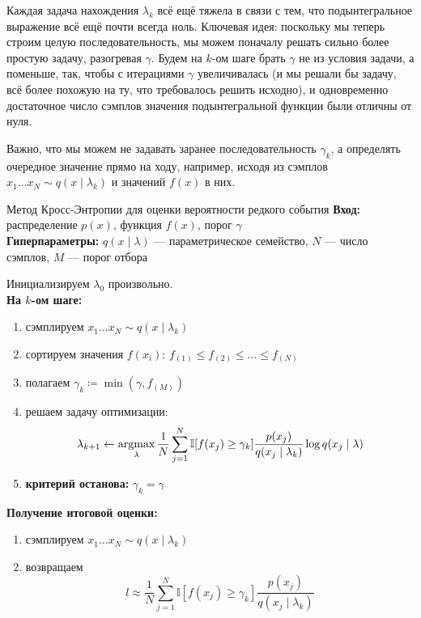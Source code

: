 Каждая задача нахождения $\lambda_k$ всё ещё тяжела в связи с тем, что подынтегральное выражение всё ещё почти всегда ноль. Ключевая идея: поскольку мы теперь строим целую последовательность, мы можем поначалу решать сильно более простую задачу, разогревая $\gamma$. Будем на $k$-ом шаге брать $\gamma$ не из условия задачи, а поменьше, так, чтобы с итерациями $\gamma$ увеличивалась (и мы решали бы задачу, всё более похожую на ту, что требовалось решить исходно), и одновременно достаточное число сэмплов значения подынтегральной функции были отличны от нуля.

Важно, что мы можем не задавать заранее последовательность $\gamma_k$, а определять очередное значение прямо на ходу, например, исходя из сэмплов $x_1 \dots x_N \sim q(x \mid \lambda_{k})$ и значений $f(x)$ в них.

\begin{algorithm}[label=alg:rareeventestimate]{Метод Кросс-Энтропии для оценки вероятности редкого события}
\textbf{Вход:} распределение $p(x)$, функция $f(x)$, порог $\gamma$ \\
\textbf{Гиперпараметры:} $q(x \mid \lambda)$ --- параметрическое семейство, $N$ --- число сэмплов, $M$ --- порог отбора

\vspace{0.3cm}
Инициализируем $\lambda_0$ произвольно. \\
\textbf{На $k$-ом шаге:}
\begin{enumerate}
    \item сэмплируем $x_1 \dots x_N \sim q(x \mid \lambda_k)$
    \item сортируем значения $f(x_i)$: $f_{(1)} \le f_{(2)} \le \dots \le f_{(N)}$
    \item полагаем $\gamma_k \coloneqq \min(\gamma, f_{(M)})$
    \item решаем задачу оптимизации:
    \begin{equation}\label{CEM_optimization_general}
    \lambda_{k+1} \leftarrow \mathop{\mathrm{argmax}}_{\lambda} \frac{1}{N} \sum_{j=1}^N \mathbb{I}[f(x_j) \ge \gamma_k]\frac{p(x_j)}{q(x_j \mid \lambda_k)} \log q(x_j \mid \lambda)
    \end{equation}
    \item \textbf{критерий останова:} $\gamma_k = \gamma$
\end{enumerate}

\textbf{Получение итоговой оценки:}
\begin{enumerate}
    \item сэмплируем $x_1 \dots x_N \sim q(x \mid \lambda_k)$
    \item возвращаем
    $$l \approx \frac{1}{N} \sum_{j=1}^N \mathbb{I}[f(x_j) \ge \gamma_k]\frac{p(x_j)}{q(x_j \mid \lambda_k)}$$
\end{enumerate}
\end{algorithm}

